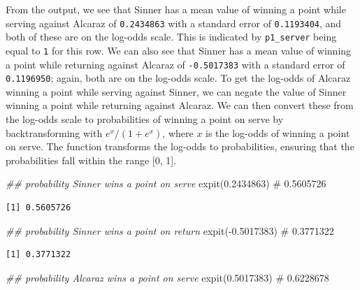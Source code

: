 \documentclass[
  letterpaper,
  DIV=11,
  numbers=noendperiod]{scrartcl}
\newenvironment{Shaded}{\begin{snugshade}}{\end{snugshade}}
\newcommand{\CommentTok}[1]{\textcolor[rgb]{0.37,0.37,0.37}{#1}}
\newcommand{\DocumentationTok}[1]{\textcolor[rgb]{0.37,0.37,0.37}{\textit{#1}}}
\newcommand{\FloatTok}[1]{\textcolor[rgb]{0.68,0.00,0.00}{#1}}
\newcommand{\FunctionTok}[1]{\textcolor[rgb]{0.28,0.35,0.67}{#1}}
\newcommand{\NormalTok}[1]{\textcolor[rgb]{0.00,0.23,0.31}{#1}}
\newcommand{\SpecialCharTok}[1]{\textcolor[rgb]{0.37,0.37,0.37}{#1}}
\begin{document}
\linespread{2}

From the output, we see that Sinner has a mean value of winning a point
while serving against Alcaraz of \texttt{0.2434863} with a standard
error of \texttt{0.1193404}, and both of these are on the log-odds
scale. This is indicated by \texttt{p1\_server} being equal to
\texttt{1} for this row. We can also see that Sinner has a mean value of
winning a point while returning against Alcaraz of \texttt{-0.5017383}
with a standard error of \texttt{0.1196950}; again, both are on the
log-odds scale. To get the log-odds of Alcaraz winning a point while
serving against Sinner, we can negate the value of Sinner winning a
point while returning against Alcaraz. We can then convert these from
the log-odds scale to probabilities of winning a point on serve by
backtransforming with \(e^x / (1 + e^x)\), where \(x\) is the log-odds
of winning a point on serve. The function transforms the log-odds to
probabilities, ensuring that the probabilities fall within the range
{[}0, 1{]}.

\linespread{0.9}

\begin{Shaded}
\begin{Highlighting}[]
\DocumentationTok{\#\# probability Sinner wins a point on serve}
\FunctionTok{expit}\NormalTok{(}\FloatTok{0.2434863}\NormalTok{) }\CommentTok{\# 0.5605726}
\end{Highlighting}
\end{Shaded}

\begin{verbatim}
[1] 0.5605726
\end{verbatim}

\begin{Shaded}
\begin{Highlighting}[]
\DocumentationTok{\#\# probability Sinner wins a point on return}
\FunctionTok{expit}\NormalTok{(}\SpecialCharTok{{-}}\FloatTok{0.5017383}\NormalTok{) }\CommentTok{\#  0.3771322}
\end{Highlighting}
\end{Shaded}

\begin{verbatim}
[1] 0.3771322
\end{verbatim}

\begin{Shaded}
\begin{Highlighting}[]
\DocumentationTok{\#\# probability Alcaraz wins a point on serve}
\FunctionTok{expit}\NormalTok{(}\FloatTok{0.5017383}\NormalTok{) }\CommentTok{\# 0.6228678}
\end{Highlighting}
\end{Shaded}
\end{document}
